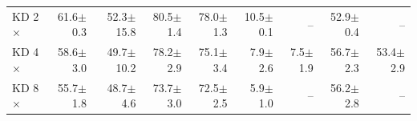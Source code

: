 \begin{tabular}{lrrrrrrrr}
\midrule
KD 2$\times$ & 61.6{\scriptsize$\pm$0.3} & 52.3{\scriptsize$\pm$15.8} & 80.5{\scriptsize$\pm$1.4} & 78.0{\scriptsize$\pm$1.3} & 10.5{\scriptsize$\pm$0.1} & -- & 52.9{\scriptsize$\pm$0.4} & -- \\
KD 4$\times$ & 58.6{\scriptsize$\pm$3.0} & 49.7{\scriptsize$\pm$10.2} & 78.2{\scriptsize$\pm$2.9} & 75.1{\scriptsize$\pm$3.4} & 7.9{\scriptsize$\pm$2.6} & 7.5{\scriptsize$\pm$1.9} & 56.7{\scriptsize$\pm$2.3} & 53.4{\scriptsize$\pm$2.9} \\
KD 8$\times$ & 55.7{\scriptsize$\pm$1.8} & 48.7{\scriptsize$\pm$4.6} & 73.7{\scriptsize$\pm$3.0} & 72.5{\scriptsize$\pm$2.5} & 5.9{\scriptsize$\pm$1.0} & -- & 56.2{\scriptsize$\pm$2.8} & -- \\
\bottomrule
\end{tabular}
